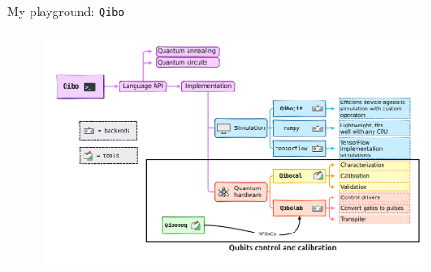 \documentclass[8pt, xcolor={svgnames}, hyperref={linkcolor=black}]{beamer}
\begin{document}
\begin{frame}{My playground: \texttt{Qibo}}
\begin{figure}  
   \includegraphics[width=1\textwidth]{figures/eco3.png}
\end{figure}
\end{frame}
\end{document}
